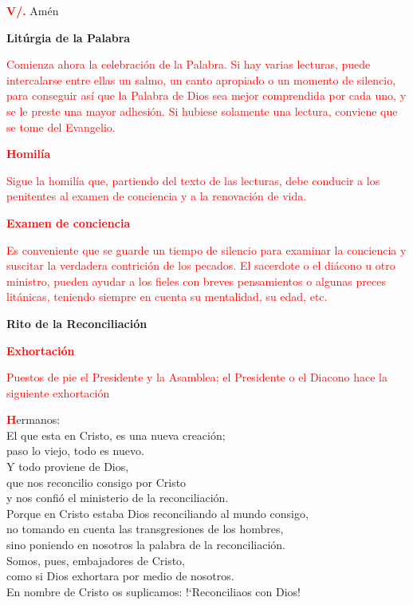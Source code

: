 \documentclass[12pt, letterpaper]{report}
\begin{document}
\noindent
\Large {\bfseries \textcolor{red}{V/.}} \hspace{1cm} Am\'en

\begin{center}
\Huge {\bfseries Lit\'urgia de la Palabra}
\end{center}

\large {\textcolor{red}{Comienza ahora la celebraci\'on de la Palabra. Si hay varias lecturas, puede intercalarse entre ellas un salmo, un canto apropiado o un momento de silencio, para conseguir as\'i que la Palabra de Dios sea mejor comprendida por cada uno, y se le preste una mayor adhesi\'on. Si hubiese solamente una lectura, conviene que se tome del Evangelio.}}

\Large {\bfseries \textcolor{red}{Homil\'ia}}

\large {\textcolor{red}{Sigue la homil\'ia que, partiendo del texto de las lecturas, debe conducir a los penitentes al examen de conciencia y a la renovaci\'on de vida.}}

\Large {\bfseries \textcolor{red}{Examen de conciencia}}

\large {\textcolor{red}{Es conveniente que se guarde un tiempo de silencio para examinar la conciencia y suscitar la verdadera contrici\'on de los pecados. El sacerdote o el di\'acono u otro ministro, pueden ayudar a los fieles con breves pensamientos o algunas preces lit\'anicas, teniendo siempre en cuenta su mentalidad, su edad, etc.}}

\newpage

\begin{center}
\Huge {\bfseries Rito de la Reconciliaci\'on}
\end{center}

\Large {\bfseries \textcolor{red}{Exhortaci\'on}} 

\large {\textcolor{red}{Puestos de pie el Presidente y la Asamblea; el Presidente o el Diacono hace la siguiente exhortaci\'on}} 

\lettrine[lines=2]{\bfseries \textcolor{red}{H}}{}\Large {ermanos:\\
El que esta en Cristo, es una nueva creaci\'on;\\
paso lo viejo, todo es nuevo.\\
Y todo proviene de Dios,\\
que nos reconcilio consigo por Cristo\\
y nos confi\'o el ministerio de la reconciliaci\'on.\\
Porque en Cristo estaba Dios reconciliando al mundo consigo,\\
no tomando en cuenta las transgresiones de los hombres,\\
sino poniendo en nosotros la palabra de la reconciliaci\'on.\\
Somos, pues, embajadores de Cristo,\\
como si Dios exhortara por medio de nosotros.\\
En nombre de Cristo os suplicamos: !`Reconciliaos con Dios!
}
\end{document}
